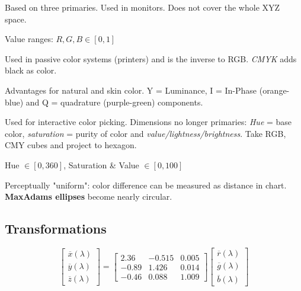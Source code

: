 \begin{definition}[RGB]
  Based on three primaries. Used in monitors. Does not cover the whole XYZ space.
\end{definition}

\begin{theorem}
  Value ranges: \(R, G, B \in [0, 1]\)
\end{theorem}

\begin{definition}[CMY]
  Used in passive color systems (printers) and is the inverse to RGB.
  \textit{CMYK} adds black as color.
\end{definition}

\begin{definition}[YIQ]
  Advantages for natural and skin color. Y = Luminance, I = In-Phase (orange-blue) and Q = quadrature (purple-green) components.
\end{definition}

\begin{definition}[HSV]
  Used for interactive color picking.
  Dimensions no longer primaries:
  \textit{Hue} = base color, \textit{saturation} = purity of color and \textit{value/lightness/brightness}. Take RGB, CMY cubes and project to hexagon.
\end{definition}

\begin{theorem}
  Hue \(\in [0, 360]\), Saturation \& Value \(\in [0, 100]\)
\end{theorem}

\begin{definition}
  Perceptually "uniform": color difference can be measured as distance in chart.
  \textbf{MaxAdams ellipses} become nearly circular.
\end{definition}

\subsection{Transformations}

\begin{definition}
  \[\begin{bmatrix}
    \overline{x}(\lambda) \\ \overline{y}(\lambda) \\ \overline{z}(\lambda)
  \end{bmatrix} = \begin{bmatrix}
    2.36 & -0.515 & 0.005 \\ -0.89 & 1.426 & 0.014 \\ -0.46 & 0.088 & 1.009
  \end{bmatrix} \begin{bmatrix}
    \overline{r}(\lambda) \\ \overline{g}(\lambda) \\ \overline{b}(\lambda)
  \end{bmatrix}\]
\end{definition}

